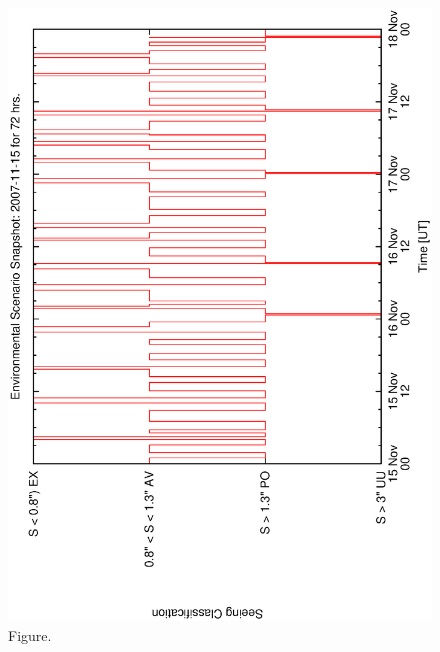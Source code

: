 \documentclass[12pt,a4paper]{article}
\begin{document}
\clearpage
\begin{figure}[htbp]
 \begin{center}
  \includegraphics[scale=1.0, angle=0]{figures/env_snapshot_2007-11-15_72.eps}
 \end{center}
  \caption[Figure.]
{Figure.}
\end{figure}
\clearpage
\end{document}
